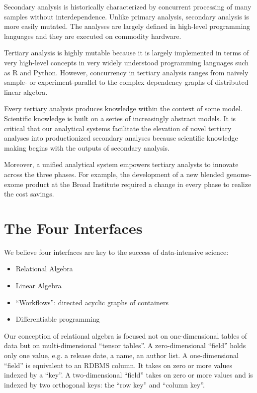 \documentclass[10pt]{article}
\begin{document}
Secondary analysis is historically characterized by concurrent processing of many samples without interdependence.
Unlike primary analysis, secondary analysis is more easily mutated.
The analyses are largely defined in high-level programming languages and they are executed on commodity hardware.

Tertiary analysis is highly mutable because it is largely implemented in terms of very high-level concepts in very widely understood programming languages such as R and Python.
However, concurrency in tertiary analysis ranges from naively sample- or experiment-parallel to the complex dependency graphs of distributed linear algebra.

Every tertiary analysis produces knowledge within the context of some model. Scientific knowledge is built on a series of increasingly abstract models.
It is critical that our analytical systems facilitate the elevation of novel tertiary analyses into productionized secondary analyses because scientific knowledge making begins with the outputs of secondary analysis.

Moreover, a unified analytical system empowers tertiary analysts to innovate across the three phases.
For example, the development of a new blended genome-exome product at the Broad Institute required a change in every phase to realize the cost savings.

\section{The Four Interfaces}

We believe four interfaces are key to the success of data-intensive science:

\begin{itemize}
\item Relational Algebra
\item Linear Algebra
\item ``Workflows'': directed acyclic graphs of containers
\item Differentiable programming
\end{itemize}

Our conception of relational algebra is focused not on one-dimensional tables of data but on multi-dimensional ``tensor tables''.
A zero-dimensional ``field'' holds only one value, e.g. a release date, a name, an author list. A one-dimensional ``field'' is equivalent to an RDBMS column.
It takes on zero or more values indexed by a ``key''. A two-dimensional ``field'' takes on zero or more values and is indexed by two orthogonal keys: the ``row key'' and ``column key''.
\end{document}

